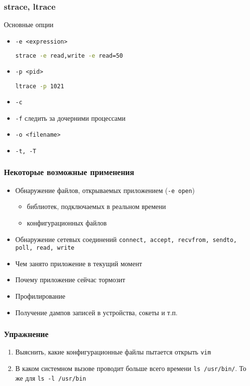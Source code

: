\begin{frame}[fragile]
  \frametitle{strace, ltrace}
  \begin{center}
   Основные опции 
  \end{center}
  \begin{itemize}
   \item \texttt{-e <expression>}
\begin{lstlisting}[language=sh]
  strace -e read,write -e read=50 
\end{lstlisting}
   \item \texttt{-p <pid>}
\begin{lstlisting}[language=sh]
  ltrace -p 1021
\end{lstlisting}
   \item \texttt{-c}
   \item \texttt{-f} следить за дочерними процессами
   \item \texttt{-o <filename>}
   \item \texttt{-t, -T}
  \end{itemize}
\end{frame}

\begin{frame}
 \frametitle{Некоторые возможные применения}
 \begin{itemize}
  \item Обнаружение файлов, открываемых приложением (\texttt{-e open})
    \begin{itemize}
      \item библиотек, подключаемых в реальном времени
      \item конфигурационных файлов
    \end{itemize}
   \item Обнаружение сетевых соединений \texttt{connect, accept, recvfrom, sendto, poll, read, write} 
   \item Чем занято приложение в текущий момент
   \item Почему приложение сейчас тормозит
   \item Профилирование
   \item Получение дампов записей в устройства, сокеты и т.п.
 \end{itemize}
\end{frame}

\begin{frame}
 \frametitle{Упражнение}
 \begin{enumerate}
   \item Выяснить, какие конфигурационные файлы пытается открыть \texttt{vim}
   \item В каком системном вызове проводит больше всего времени \texttt{ls /usr/bin/}. То же для \texttt{ls -l /usr/bin}
 \end{enumerate}
\end{frame}
